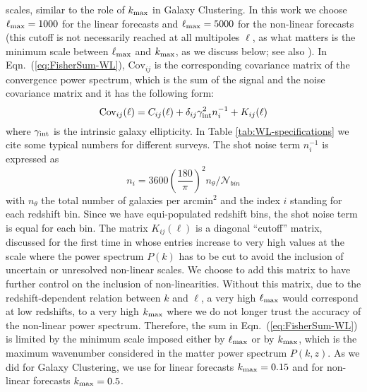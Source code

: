 scales, similar to the role of $k_{\rm max}$ in Galaxy Clustering. In this work we choose $\ell_{\mathrm{max}} = 1000$ for the linear forecasts and $\ell_{\mathrm{max}} = 5000$ for the
non-linear forecasts (this cutoff is not necessarily reached at all multipoles $\ell$, as what matters is the minimum scale between $\ell_{\rm max}$ and $k_{\rm max}$, as we discuss below; see also \cite{casas_fitting_2015}).
In Eqn.\ (\ref{eq:FisherSum-WL}), $\textrm{Cov}_{ij}$ is the corresponding covariance matrix of the 
convergence power spectrum, which is the sum of the signal and the noise covariance matrix and it has the following form:
\begin{equation}
\textrm{Cov}_{ij}(\ell)=C_{ij}(\ell)+\delta_{ij}\gamma_{\rm int}^{2}n_{i}^{-1}+K_{ij}(\ell)
\end{equation}
where $\gamma_{\rm int}$ is the intrinsic galaxy ellipticity. In Table \ref{tab:WL-specifications} we cite some typical numbers for different surveys.
The shot noise term $n_{i}^{-1}$ is expressed as
\begin{equation}
n_{i}=3600\left(\frac{180}{\pi}\right)^{2}n_{\theta}/\mathcal{N}_{bin}
\end{equation}
with $n_{\theta}$ the total number of galaxies per $\text{arcmin}^2$ and the index $i$ standing for each redshift bin.
Since we have equi-populated redshift bins, the shot noise term is equal for each bin.
The matrix $K_{ij}(\ell)$
is a diagonal ``cutoff'' matrix, discussed for the first time in \cite{casas_fitting_2015} whose entries increase to very high
values at the scale where the power spectrum $P(k)$ has to be cut
to avoid the inclusion of uncertain or unresolved non-linear scales. We choose to add this matrix to have 
further control on the inclusion of non-linearities. Without this matrix, due to the redshift-dependent relation between
$k$ and $\ell$, a very high $\ell_{\mathrm{max}}$ would correspond at low redshifts, to a very high $k_{\rm max}$ where we do not longer
trust the accuracy of the non-linear power spectrum. Therefore, the sum in Eqn.\ (\ref{eq:FisherSum-WL}) is limited by the minimum scale imposed
either by $\ell_{\mathrm{max}}$ or by $k_{\rm max}$, which is the maximum wavenumber considered in the matter power spectrum $P(k,z)$. As we did for Galaxy Clustering, we use for linear forecasts $k_{\rm max}=0.15$ and for non-linear forecasts $k_{\rm max}=0.5$.



